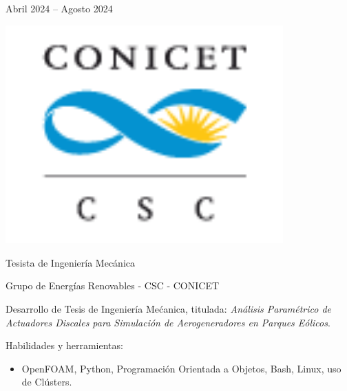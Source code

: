 \documentclass[a4paper,10pt]{article}
\newlength{\cvcolumngapwidth}
\newlength{\cvleftcolumnwidth}
\newlength{\cvrightcolumnwidth}
\newcommand{\cvtitlestyle}[1]{{\large\cvtitlefont\textcolor{cvtitlecolor}{#1}}}
\newcommand{\cvsubtitlestyle}[1]{{\cvtitlefont\textcolor{cvtitlecolor}{#1}}}
\newcommand{\cvdurationstyle}[1]{{\small\cvdurationfont\textcolor{cvdurationcolor}{#1}}}
\newlength{\cvafteritemskipamount}
\newlength{\cvaftertitleskipamount}
\newlength{\cvparskip}
\newcommand{\cvitem}[2]{
    \begin{minipage}[t]{\cvleftcolumnwidth}
        \raggedleft #1
    \end{minipage}%
    \hspace{\cvcolumngapwidth}%
    \begin{minipage}[t]{\cvrightcolumnwidth}
        \setlength{\parskip}{\cvparskip} #2
    \end{minipage}

    \vspace{\cvafteritemskipamount}
}
\newcommand{\cvtitle}[1]{
    \cvtitlestyle{#1}

    \vspace{\cvaftertitleskipamount}
    \vspace{-\cvparskip}
}
\begin{document}
\cvitem{
	\cvdurationstyle{Abril 2024 -- Agosto 2024}
}{
	\begin{minipage}{0.1\textwidth}
		\centering
		\includegraphics[width=0.8\textwidth]{../logos-photos/Logo_CSC.png}   
	\end{minipage}
	\cvtitle{Tesista de Ingeniería Mecánica}
	
	\cvsubtitlestyle{Grupo de Energías Renovables - CSC - CONICET}

    Desarrollo de Tesis de Ingeniería Mećanica, titulada: \textit{Análisis Paramétrico de Actuadores Discales para Simulación
    de Aerogeneradores en Parques Eólicos}.

    Habilidades y herramientas:
    \begin{itemize}
        \item OpenFOAM, Python, Programación Orientada a Objetos, Bash, Linux, uso de Clústers.
    \end{itemize}
}
\end{document}
